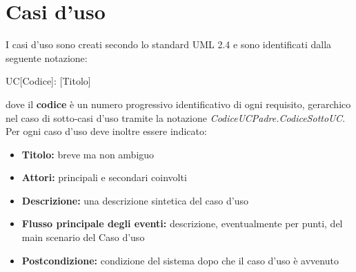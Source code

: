 \documentclass[12pt,a4paper,twoside,openright,english]{book}
\begin{document}
\section{Casi d'uso}\label{usecase}
I casi d'uso sono creati secondo lo standard UML 2.4 e sono identificati dalla seguente notazione:
\begin{center}
	UC[Codice]: [Titolo]
\end{center}
dove il \textbf{codice} è un numero progressivo identificativo di ogni requisito, gerarchico nel  caso di sotto-casi d'uso tramite la notazione \textit{CodiceUCPadre.CodiceSottoUC}. Per ogni caso d'uso deve inoltre essere indicato:
\begin{itemize}
	\itemsep0em 
	\item \textbf{Titolo:} breve ma non ambiguo
	\item \textbf{Attori:} principali e secondari coinvolti
	\item \textbf{Descrizione:} una descrizione sintetica del caso d'uso
	\item \textbf{Flusso principale degli eventi:} descrizione, eventualmente per punti, del main scenario del Caso d'uso
	\item \textbf{Postcondizione:} condizione del sistema dopo che il caso d'uso è avvenuto
\end{itemize}
\begin{small}

\end{small}





\end{document}
